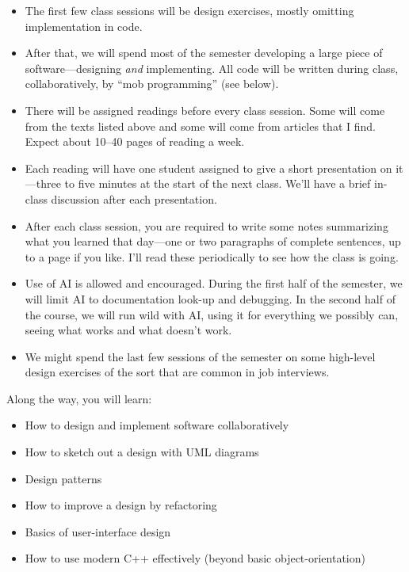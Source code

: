 \documentclass[12pt]{article}
\begin{document}
\begin{itemize}
\item The first few class sessions will be design exercises, mostly omitting
implementation in code.

\item After that, we will spend most of the semester developing a large
piece of software---designing \emph{and} implementing. All code will be
written during class, collaboratively, by ``mob programming'' (see below). 

\item There will be assigned readings before every class session. Some will
come from the texts listed above and some will come from articles that I find.
Expect about 10--40 pages of reading a week.

\item Each reading will have one student assigned to give a short presentation
on it---three to five minutes at the start of the next class. We'll have a
brief in-class discussion after each presentation.

\item After each class session, you are required to write some notes
summarizing what you learned that day---one or two paragraphs of complete
sentences, up to a page if you like. I'll read these periodically to see how
the class is going.

\item Use of AI is allowed and encouraged. During the first half of the
semester, we will limit AI to documentation look-up and debugging. In the
second half of the course, we will run wild with AI, using it for everything
we possibly can, seeing what works and what doesn't work.

\item We might spend the last few sessions of the semester on some high-level
design exercises of the sort that are common in job interviews.
\end{itemize}

Along the way, you will learn:

\begin{itemize}
\item How to design and implement software collaboratively

\item How to sketch out a design with UML diagrams

\item Design patterns

\item How to improve a design by refactoring

\item Basics of user-interface design

\item How to use modern C++ effectively (beyond basic object-orientation)
\end{itemize}
\end{document}
